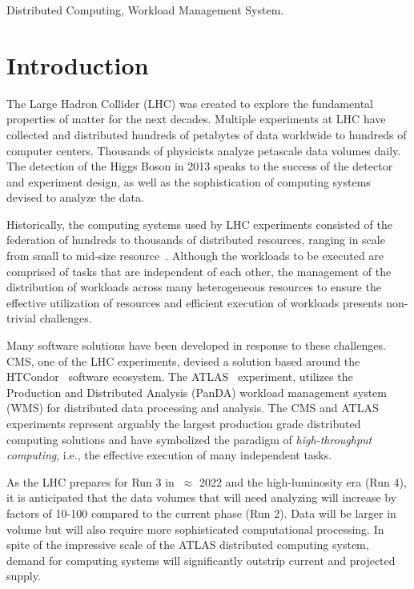 \documentclass[conference]{IEEEtran}
\begin{document}
\begin{IEEEkeywords}
Distributed Computing, Workload Management System.
\end{IEEEkeywords}

\section{Introduction}
\label{sec:intro}

The Large Hadron Collider (LHC) was created to explore the fundamental
properties of matter for the next decades. Multiple experiments at LHC have
collected and distributed hundreds of petabytes of data worldwide to hundreds of
computer centers. Thousands of physicists analyze petascale data volumes daily.
The detection of the Higgs Boson in 2013 speaks to the success of the detector
and experiment design, as well as the sophistication of computing systems
devised to analyze the data.

Historically, the computing systems used by LHC experiments consisted of the
federation of hundreds to thousands of distributed resources, %
ranging in scale from small to mid-size resource~\cite{foster2003grid}. Although
the workloads to be executed are comprised of tasks that are independent of each
other, the management of the distribution of workloads across many heterogeneous
resources to ensure the effective utilization of resources and efficient
execution of workloads presents non-trivial challenges.

Many software solutions have been developed in response to these challenges.
CMS, one of the LHC experiments, devised a solution based around the
HTCondor~\cite{thain2005distributed} software ecosystem. The
ATLAS~\cite{Aad:2008} experiment, utilizes the Production and Distributed
Analysis (PanDA) workload management system~\cite{Maeno2011} (WMS) for
distributed data processing and analysis. The CMS and ATLAS experiments
represent arguably the largest production grade distributed computing solutions
and have symbolized the paradigm of {\it high-throughput computing}, i.e., the
effective execution of many independent tasks.

As the LHC prepares for Run 3 in $~\approx$ 2022 and the high-luminosity era
(Run 4), it is anticipated that the data volumes that will need analyzing will
increase by factors of 10-100 compared to the current phase (Run 2). Data will
be larger in volume but will also require more sophisticated computational
processing. In spite of the impressive scale of the ATLAS distributed computing
system, demand for computing systems will significantly outstrip current and projected supply.
\end{document}
